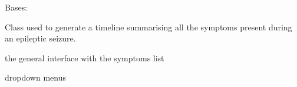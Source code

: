\documentclass[letterpaper,10pt,english]{sphinxmanual}
\begin{document}
\begin{fulllineitems}
\label{\detokenize{general_interface:general_interface.FriseSymptomes}}
\pysigstartsignatures
{}
\pysigstopsignatures
\sphinxAtStartPar
Bases: 

\sphinxAtStartPar
Class used to generate a timeline summarising all the symptoms present during an epileptic seizure.

\begin{fulllineitems}
\label{\detokenize{general_interface:general_interface.FriseSymptomes.interfaceGenerale}}
\pysigstartsignatures
{}
\pysigstopsignatures
\sphinxAtStartPar
the general interface with the symptoms list
\begin{quote}\begin{description}
\sphinxAtStartPar
{\hyperref[\detokenize{general_interface:general_interface.InterfaceGenerale}]{}}

\end{description}\end{quote}

\end{fulllineitems}


\begin{fulllineitems}
\label{\detokenize{general_interface:general_interface.FriseSymptomes.MenuDeroulant}}
\pysigstartsignatures
{}
\pysigstopsignatures
\sphinxAtStartPar
dropdown menus
\begin{quote}\begin{description}
\sphinxAtStartPar
{\hyperref[\detokenize{general_interface:general_interface.Menu_symptomes}]{}}


\end{description}
\end{quote}
\end{fulllineitems}
\end{fulllineitems}
\end{document}
